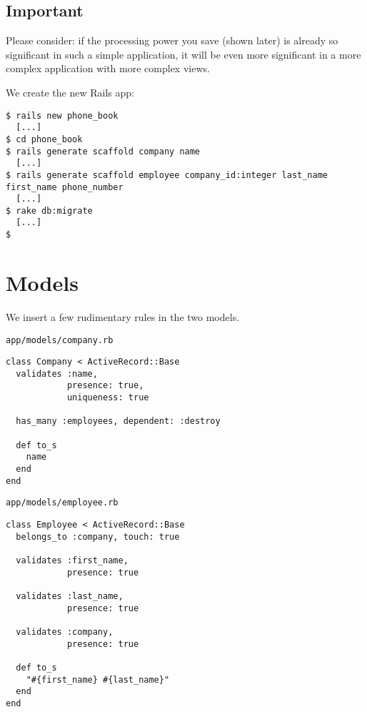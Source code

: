 \documentclass[a4paper]{book}
\begin{document}
\subsection{Important}\label{important-15}

Please consider: if the processing power you save (shown later) is already so significant in such a simple application, it will be even more significant in a more complex application with more complex views.

We create the new Rails app:

\begin{shaded}\begin{verbatim}
$ rails new phone_book
  [...]
$ cd phone_book
$ rails generate scaffold company name
  [...]
$ rails generate scaffold employee company_id:integer last_name first_name phone_number
  [...]
$ rake db:migrate
  [...]
$
\end{verbatim}\end{shaded}

\section{Models}\label{models}

We insert a few rudimentary rules in the two models.

\texttt{app/models/company.rb}

\begin{shaded}\begin{verbatim}
class Company < ActiveRecord::Base
  validates :name,
            presence: true,
            uniqueness: true

  has_many :employees, dependent: :destroy

  def to_s
    name
  end
end
\end{verbatim}\end{shaded}

\texttt{app/models/employee.rb}

\begin{shaded}\begin{verbatim}
class Employee < ActiveRecord::Base
  belongs_to :company, touch: true

  validates :first_name,
            presence: true

  validates :last_name,
            presence: true

  validates :company,
            presence: true

  def to_s
    "#{first_name} #{last_name}"
  end
end
\end{verbatim}\end{shaded}
\end{document}
